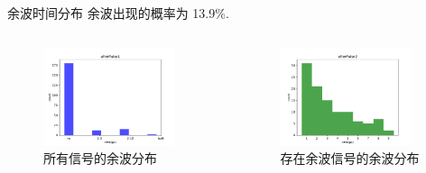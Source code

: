 \documentclass[10pt]{beamer}
\begin{document}
\begin{frame}[label={sec:orgbc923ce}]{余波时间分布}
余波出现的概率为 13.9\%.

\begin{columns}
\begin{column}{0.5\columnwidth}
\begin{figure}[htbp]
\centering
\includegraphics[width=0.9\textwidth]{../../DetectorPerform/afterPulse/fig/afterPulse01.pdf}
\caption{所有信号的余波分布}
\end{figure}
\end{column}

\begin{column}{0.5\columnwidth}
\begin{figure}[htbp]
\centering
\includegraphics[width=0.9\textwidth]{../../DetectorPerform/afterPulse/fig/afterPulse02.pdf}
\caption{存在余波信号的余波分布}
\end{figure}
\end{column}
\end{columns}
\end{frame}
\end{document}
